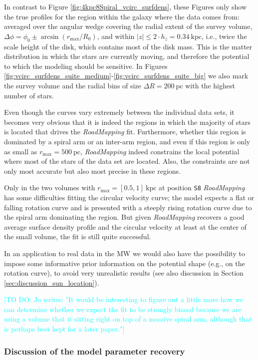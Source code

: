 \documentclass[iop,revtex4,numberedappendix,appendixfloats]{emulateapj}
\newcommand{\RM}{{\sl RoadMapping}}
\newcommand{\Jo}[1]{\textcolor{Cyan}{#1}}
\begin{document}
In contrast to Figure \ref{fig:4kpc8Spiral_vcirc_surfdens}, these Figures only show the true profiles for the region within the galaxy where the data comes from: averaged over the angular wedge covering the radial extent of the survey volume, $\Delta \phi = \phi_0 \pm \arcsin(r_\text{max}/R_0)$, and within $|z| \leq 2 \cdot h_z = 0.34~\text{kpc}$, i.e., twice the scale height of the disk, which contains most of the disk mass. This is the matter distribution in which the stars are currently moving, and therefore the potential to which the modeling should be sensitive. In Figures \ref{fig:vcirc_surfdens_suite_medium}-\ref{fig:vcirc_surfdens_suite_big} we also mark the survey volume and the radial bins of size $\Delta R =200~\text{pc}$ with the highest number of stars. 

Even though the curves vary extremely between the individual data sets, it becomes very obvious that it is indeed the regions in which the majority of stars is located that drives the \RM{} fit. Furthermore, whether this region is dominated by a spiral arm or an inter-arm region, and even if this region is only as small as $r_\text{max}=500~\text{pc}$, \RM{} indeed constrains the local potential where most of the stars of the data set are located. Also, the constraints are not only most accurate but also most precise in these regions.

Only in the two volumes with $r_\text{max}=[0.5,1]~\text{kpc}$ at position \texttt{S8} \RM{} has some difficulties fitting the circular velocity curve; the model expects a flat or falling rotation curve and is presented with a steeply rising rotation curve due to the spiral arm dominating the region. But given \RM{} recovers a good average surface density profile and the circular velocity at least at the center of the small volume, the fit is still quite successful. 

In an application to real data in the MW we would also have the possibility to impose some informative prior information on the potential shape (e.g., on the rotation curve), to avoid very unrealistic results (see also discussion in Section \ref{sec:discussion_sun_location}).


\Jo{[TO DO: Jo writes: "It would be interesting to figure out a little more how we can determine whether we expect the fit to be strongly biased because we are using a volume that it sitting right on top of a massive spiral arm, although that is perhaps best kept for a later paper."]}

\subsubsection{Discussion of the model parameter recovery} \label{sec:parameter recovery}
\end{document}
